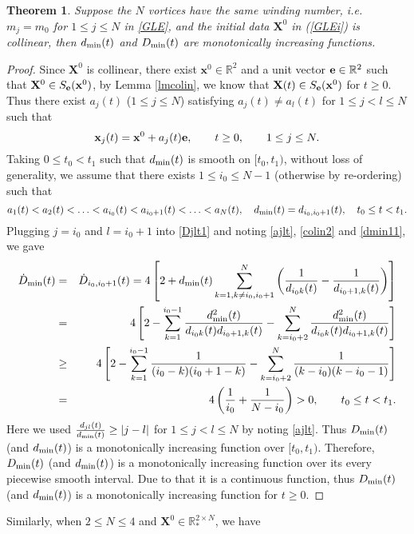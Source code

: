 \documentclass{aims}
\theoremstyle{plain}
\newtheorem{theorem}{Theorem}[section]
\theoremstyle{definition}
\newcommand{\bx}{{\mathbf x}}
\newcommand{\bX}{{\mathbf X}}
\newcommand{\nn}{\nonumber}
\newcommand{\be} {\begin{equation}}
\newcommand{\ee}{\end{equation}}
\newcommand{\bea}{\begin{eqnarray}}
\newcommand{\eea}{\end{eqnarray} }
\begin{document}
\begin{theorem}\label{cdi}
Suppose the $N$ vortices have the same winding number, i.e. $m_j=m_0$ for $1 \le j\le N$ in \eqref{GLE}, and the initial data $\mathbf{X}^0$ in (\ref{GLEi}) is collinear, then
$d_{\rm min}(t)$ and $D_{\rm min}(t)$ are monotonically increasing functions.
\end{theorem}
\begin{proof}
Since $\mathbf{X}^0$ is collinear,
there exist $\bx^0\in {\mathbb R}^2$ and a unit vector ${\bf e}\in {\mathbb R}^2$ such that  $\bX^0\in S_{{\bf e}}(\bx^0)$, by Lemma \ref{lmcolin},
we know that $\bX(t)\in S_{{\bf e}}(\bx^0)$ for $t\ge0$.
Thus there exist $a_j(t)$ ($1\le j\le N$) satisfying $a_j(t)\ne a_l(t)$ for
$1\le j<l\le N$ such that
\be\label{colin2}
\bx_j(t)=\bx^0+a_j(t) {\bf e}, \qquad t\ge0, \qquad 1\le j\le N.
\ee
Taking $0\le t_0<t_1$ such that $d_{\rm min}(t)$ is smooth on $[t_0,t_1)$,
without loss of generality, we assume that there exists $1\leq i_0\leq N-1$ (otherwise by re-ordering) such that
\be\label{ajlt}
a_1(t)<a_2(t)<\ldots <a_{i_0}(t)<a_{i_0+1}(t)<\ldots<a_N(t), \quad d_{\rm min}(t)=d_{i_0,i_0+1}(t), \quad t_0\le t<t_1.
\ee
Plugging $j=i_0$ and $l=i_0+1$ into \eqref{Djlt1} and noting \eqref{ajlt},
 \eqref{colin2} and \eqref{dmin11}, we gave
\bea
\dot D_{\rm min}(t)&=&\dot D_{i_0,i_0+1}(t)=4\left[2+d_{\rm min}(t)\sum_{k=1,k\ne i_0,i_0+1}^N\left(\frac{1} {d_{i_0k}(t)}-
\frac{1} {d_{i_0+1,k}(t)}\right)\right]\nn\\
&=&4\left[2-\sum_{k=1}^{i_0-1}
\frac{d_{\rm min}^2(t)} {d_{i_0k}(t)d_{i_0+1,k}(t)}-\sum_{k=i_0+2}^N
\frac{d_{\rm min}^2(t)} {d_{i_0k}(t)d_{i_0+1,k}(t)}\right]\nn\\
&\ge&4\left[2-\sum_{k=1}^{i_0-1}\frac{1}
{(i_0-k)(i_0+1- k)}-\sum_{k=i_0+2}^{N}\frac{1}
{(k-i_0)(k-i_0-1)}\right]\nn\\
&=&4\left(\frac{1}{i_0}+\frac{1}{N-i_0}\right)>0, \qquad t_0\le t<t_1.\nonumber
\eea
Here we used $\frac{d_{jl}(t)}{d_{\rm min}(t)}\ge |j-l|$ for $1\le j<l\le N$ by noting \eqref{ajlt}. Thus $D_{\rm min}(t)$ (and $d_{\rm min}(t)$) is
a monotonically increasing function over $[t_0,t_1)$. Therefore,
$D_{\rm min}(t)$ (and $d_{\rm min}(t)$) is
a monotonically increasing function over its every piecewise smooth interval.
Due to that it is a continuous function, thus
$D_{\rm min}(t)$ (and $d_{\rm min}(t)$) is
a monotonically increasing function for $t\ge0$.
\end{proof}

Similarly,  when $2\le N\le 4$ and $\bX^0\in{\mathbb R}_*^{2\times N}$, we have
\end{document}
